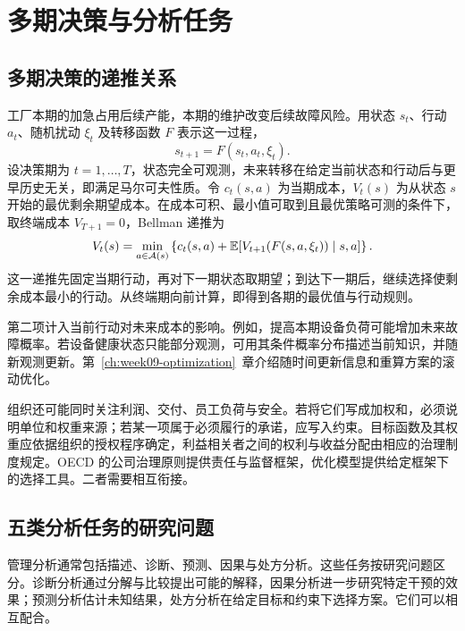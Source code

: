 \section{多期决策与分析任务}
\subsection{多期决策的递推关系}
工厂本期的加急占用后续产能，本期的维护改变后续故障风险。用状态 \(s_t\)、行动 \(a_t\)、随机扰动 \(\xi_t\) 及转移函数 \(F\) 表示这一过程，
\[
s_{t+1}=F(s_t,a_t,\xi_t).
\]
设决策期为 \(t=1,\ldots,T\)，状态完全可观测，未来转移在给定当前状态和行动后与更早历史无关，即满足马尔可夫性质。令 \(c_t(s,a)\) 为当期成本，\(V_t(s)\) 为从状态 \(s\) 开始的最优剩余期望成本。在成本可积、最小值可取到且最优策略可测的条件下，取终端成本 \(V_{T+1}=0\)，Bellman 递推为
\[
V_t(s)=\min_{a\in\mathcal A(s)}
\left\{c_t(s,a)+\mathbb E[V_{t+1}(F(s,a,\xi_t))\mid s,a]\right\}.
\]
这一递推先固定当期行动，再对下一期状态取期望；到达下一期后，继续选择使剩余成本最小的行动。从终端期向前计算，即得到各期的最优值与行动规则。

第二项计入当前行动对未来成本的影响。例如，提高本期设备负荷可能增加未来故障概率。若设备健康状态只能部分观测，可用其条件概率分布描述当前知识，并随新观测更新。第~\ref{ch:week09-optimization}~章介绍随时间更新信息和重算方案的滚动优化。

组织还可能同时关注利润、交付、员工负荷与安全。若将它们写成加权和，必须说明单位和权重来源；若某一项属于必须履行的承诺，应写入约束。目标函数及其权重应依据组织的授权程序确定，利益相关者之间的权利与收益分配由相应的治理制度规定。OECD 的公司治理原则提供责任与监督框架，优化模型提供给定框架下的选择工具\cite{oecd2023}。二者需要相互衔接。

\subsection{五类分析任务的研究问题}

管理分析通常包括描述、诊断、预测、因果与处方分析。这些任务按研究问题区分。诊断分析通过分解与比较提出可能的解释，因果分析进一步研究特定干预的效果；预测分析估计未知结果，处方分析在给定目标和约束下选择方案。它们可以相互配合。

